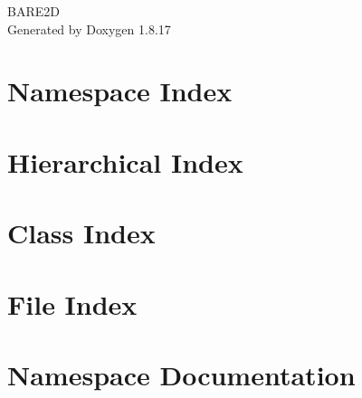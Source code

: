 \let\mypdfximage\pdfximage\def\pdfximage{\immediate\mypdfximage}\documentclass[twoside]{book}
\newcommand{\+}{\discretionary{\mbox{\scriptsize$\hookleftarrow$}}{}{}}
\newcommand{\clearemptydoublepage}{%
  \newpage{\pagestyle{empty}\cleardoublepage}%
}
\begin{document}
\hypersetup{pageanchor=false,
             bookmarksnumbered=true,
             pdfencoding=unicode
            }
\begin{titlepage}
\vspace*{7cm}
\begin{center}%
{\Large B\+A\+R\+E2D }\\
\vspace*{1cm}
{\large Generated by Doxygen 1.8.17}\\
\end{center}
\end{titlepage}
\clearemptydoublepage
{}
\tableofcontents
\clearemptydoublepage
{}
\hypersetup{pageanchor=true}

\chapter{Namespace Index}

\chapter{Hierarchical Index}

\chapter{Class Index}

\chapter{File Index}

\chapter{Namespace Documentation}





\end{document}
